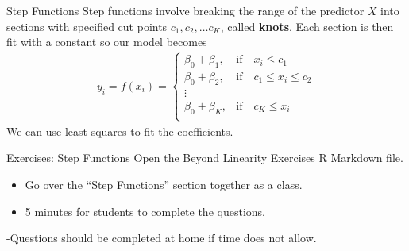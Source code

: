 \documentclass[
  ignorenonframetext,
  aspectratio=169,
]{beamer}
\begin{document}
\begin{frame}{Step Functions}
\protect\hypertarget{step-functions}{}
Step functions involve breaking the range of the predictor \(X\) into
sections with specified cut points \(c_1, c_2, \dots c_K\), called
\textbf{knots}. Each section is then fit with a constant so our model
becomes \[
\begin{aligned}
y_i = f(x_i) =\left\{\begin{array}{cl}
\beta_0 + \beta_1, & \text{if} \quad x_i \leq c_1 \\
\beta_0 + \beta_2, & \text{if} \quad c_1 \leq x_i \leq c_2 \\
\vdots \\
\beta_0 + \beta_K, & \text{if} \quad c_{K} \leq x_i\\
\end{array}\right.
\end{aligned}
\] We can use least squares to fit the coefficients.
\end{frame}

\begin{frame}{Exercises: Step Functions}
\protect\hypertarget{exercises-step-functions}{}
Open the Beyond Linearity Exercises R Markdown file.

\begin{itemize}
\item
  Go over the ``Step Functions'' section together as a class.
\item
  5 minutes for students to complete the questions.
\end{itemize}

-Questions should be completed at home if time does not allow.
\end{frame}
\end{document}
